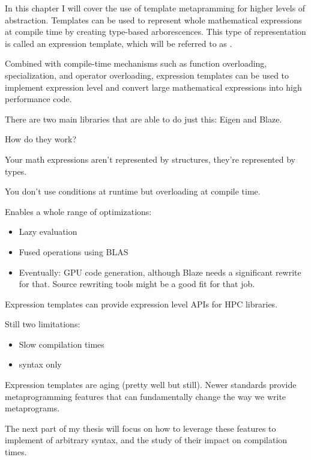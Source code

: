 \documentclass[../main]{subfiles}
\begin{document}
In this chapter I will cover the use of template metapramming for higher levels
of abstraction. Templates can be used to represent whole mathematical
expressions at compile time by creating type-based arborescences.
This type of representation is called an expression
template\cite{veldhuizen:1995}, which will be referred to as \et.

Combined with compile-time mechanisms such as function overloading,
specialization, and operator overloading, expression templates can be used to
implement expression level \dsels and convert large mathematical expressions
into high performance code.

There are two main libraries that are able to do just this: Eigen\cite{eigen}
and Blaze\cite{blazelib}.

How do they work?

Your math expressions aren't represented by structures,
they're represented by types.

You don't use conditions at runtime but overloading at compile time.

Enables a whole range of optimizations:

\begin{itemize}
\item Lazy evaluation
\item Fused operations using BLAS
\item Eventually: GPU code generation, although Blaze needs a significant
      rewrite for that. Source rewriting tools might be a good fit for that job.
\end{itemize}

Expression templates can provide expression level APIs for HPC libraries.

Still two limitations:

\begin{itemize}
\item Slow compilation times
\item \cpp syntax only
\end{itemize}

Expression templates are aging (pretty well but still).
Newer \cpp standards provide metaprogramming features that can fundamentally
change the way we write metaprograms.

The next part of my thesis will focus on how to leverage these features to
implement \dsel of arbitrary syntax, and the study of their impact on
compilation times.
\end{document}
